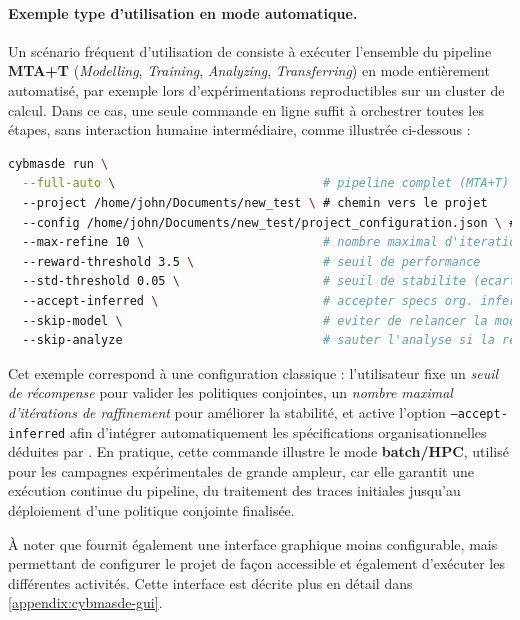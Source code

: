 \medskip
\noindent

\paragraph{Exemple type d'utilisation en mode automatique.}
Un scénario fréquent d'utilisation de  consiste à exécuter l'ensemble du pipeline \textbf{MTA+T} (\textit{Modelling}, \textit{Training}, \textit{Analyzing}, \textit{Transferring}) en mode entièrement automatisé, par exemple lors d'expérimentations reproductibles sur un cluster de calcul.
Dans ce cas, une seule commande en ligne suffit à orchestrer toutes les étapes, sans interaction humaine intermédiaire, comme illustrée ci-dessous :

\begin{lstlisting}[language=bash, caption={Exécution complète de CybMASDE en mode full-auto}, label={lst:cybmasde_full_auto}]
cybmasde run \
  --full-auto \                             # pipeline complet (MTA+T) sans interaction
  --project /home/john/Documents/new_test \ # chemin vers le projet
  --config /home/john/Documents/new_test/project_configuration.json \ # fichier de config
  --max-refine 10 \                         # nombre maximal d'iterations de raffinement
  --reward-threshold 3.5 \                  # seuil de performance
  --std-threshold 0.05 \                    # seuil de stabilite (ecart-type)
  --accept-inferred \                       # accepter specs org. inferees automatiquement
  --skip-model \                            # eviter de relancer la modelisation
  --skip-analyze                            # sauter l'analyse si la recompense est suffisante
\end{lstlisting}

Cet exemple correspond à une configuration classique : l'utilisateur fixe un \textit{seuil de récompense} pour valider les politiques conjointes, un \textit{nombre maximal d'itérations de raffinement} pour améliorer la stabilité, et active l'option \texttt{--accept-inferred} afin d'intégrer automatiquement les spécifications organisationnelles déduites par .
En pratique, cette commande illustre le mode \textbf{batch/HPC}, utilisé pour les campagnes expérimentales de grande ampleur, car elle garantit une exécution continue du pipeline, du traitement des traces initiales jusqu'au déploiement d'une politique conjointe finalisée.

À noter que  fournit également une interface graphique moins configurable, mais permettant de configurer le projet de façon accessible et également d’exécuter les différentes activités. Cette interface est décrite plus en détail dans \autoref{appendix:cybmasde-gui}.


